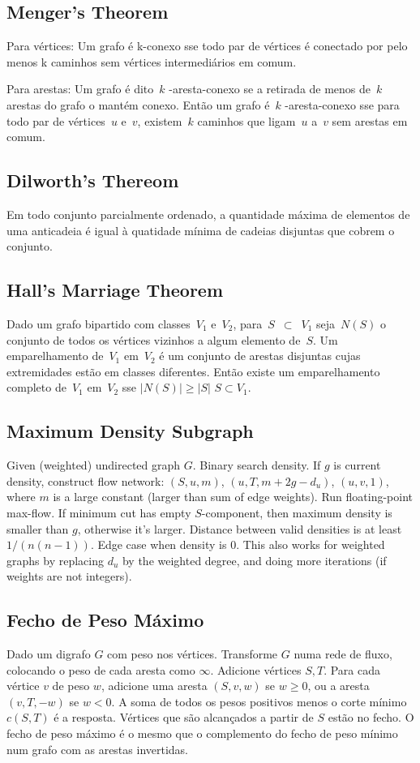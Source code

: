 \subsection{Menger's Theorem}
\item Para vértices:
Um grafo é k-conexo sse todo par de vértices é conectado por pelo menos k caminhos sem vértices intermediários em comum.
\item Para arestas:
Um grafo é dito~$k$ -aresta-conexo se a retirada de menos de~$k$ arestas do grafo o mantém conexo. Então um grafo é~$k$ -aresta-conexo sse para todo par de vértices~$u$ e~$v$, existem~$k$ caminhos que ligam~$u$ a~$v$ sem arestas em comum.

\subsection{Dilworth's Thereom}
Em todo conjunto parcialmente ordenado, a quantidade máxima de elementos de uma anticadeia é igual à  quatidade mínima de cadeias disjuntas que cobrem o conjunto.   
       
\subsection{Hall's Marriage Theorem}
Dado um grafo bipartido com classes~$V_1$ e~$V_2$, para~$S$~$\subset$~$V_1$ seja~$N(S)$ o conjunto de todos os vértices vizinhos a algum elemento de~$S$. Um emparelhamento de~$V_1$ em~$V_2$ é um conjunto de arestas disjuntas cujas extremidades estão em classes diferentes. Então existe um emparelhamento completo de~$V_1$ em~$V_2$ sse $|N(S)| \geq |S|$ \forall $ S \subset V_1 $.
    
\subsection{Maximum Density Subgraph}
Given (weighted) undirected graph $G$. Binary search density. If $g$ is
current density, construct flow network: $(S, u, m)$, $(u, T,
m+2g-d_u)$, $(u,v,1)$, where $m$ is a large constant (larger than sum
of edge weights). Run floating-point max-flow. If minimum cut has empty
$S$-component, then maximum density is smaller than $g$, otherwise it's
larger. Distance between valid densities is at least $1/(n(n-1))$. Edge
case when density is $0$. This also works for weighted graphs by
replacing $d_u$ by the weighted degree, and doing more iterations (if
weights are not integers).

\subsection{Fecho de Peso Máximo}
Dado um digrafo $G$ com peso nos vértices. Transforme $G$ numa rede de fluxo, colocando o peso de cada aresta como $\infty$. Adicione vértices $S,T$. Para cada vértice $v$ de peso $w$, adicione uma aresta $(S, v, w)$ se $w\geq 0$, ou a aresta $(v,T,-w)$ se $w<0$. A soma de todos os pesos positivos menos o corte mínimo $c(S,T)$ é a resposta. Vértices que são alcançados a partir de $S$ estão no fecho. O fecho de peso máximo é o mesmo que o complemento do fecho de peso mínimo num grafo com as arestas invertidas.

